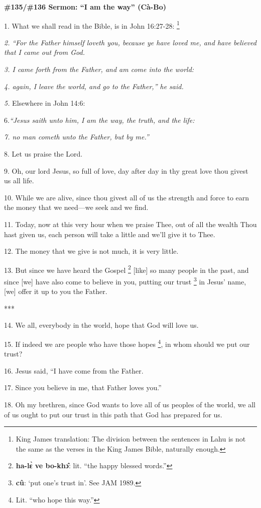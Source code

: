 
\textbf{\#135/\#136  Sermon: ``I am the way'' (Cà-Bo) }

1. What we shall read in the Bible, is in John 16:27-28:  \footnote{King James translation: The division between the sentences in Lahu is not the same as the verses in the King James Bible, naturally enough.}

\textit{2.} \textit{``For the Father himself loveth you, because ye have loved
me, and have believed that I came out from God.}

\textit{3. I came forth from the Father, and am come into the world: }

\textit{4. again, I leave the world, and go to the Father,'' he said.}

\textit{5. }Elsewhere in John 14:6:\textit{ }

6.\textit{``Jesus saith unto him, I am the way, the truth, and the life: }

\textit{7. no man cometh unto the Father, but by me.''}

8. Let us praise the Lord.

9. Oh, our lord Jesus, so full of love, day after day in thy great love thou givest
us all life.

10. While we are alive, since thou givest all of us the strength and force to earn
the money that we need---we seek and we find.

11. Today, now at this very hour when we praise Thee, out of all the wealth Thou
hast given us, each person will take a little and we'll give it to Thee.

12. The money that we give is not much, it is very little.

13. But since we have heard the Gospel \footnote{\textbf{ha-lɛ̀ ve bo-khɔ̂}: lit. ``the happy blessed words.''} [like] so many people in the past, and
since [we] have also come to believe in you, putting our trust \footnote{\textbf{cû}: `put one's trust in'. See JAM 1989.} in Jesus' name,
[we] offer it up to you the Father.

***

14. We all, everybody in the world, hope that God will love us.

15. If indeed we are people who have those hopes \footnote{Lit. ``who hope this way.''}, in whom should we put our
trust?

16. Jesus said, ``I have come from the Father.

17. Since you believe in me, that Father loves you.''

18. Oh my brethren, since God wants to love all of us peoples of the world, we
all of us ought to put our trust in this path that God has prepared for us.

